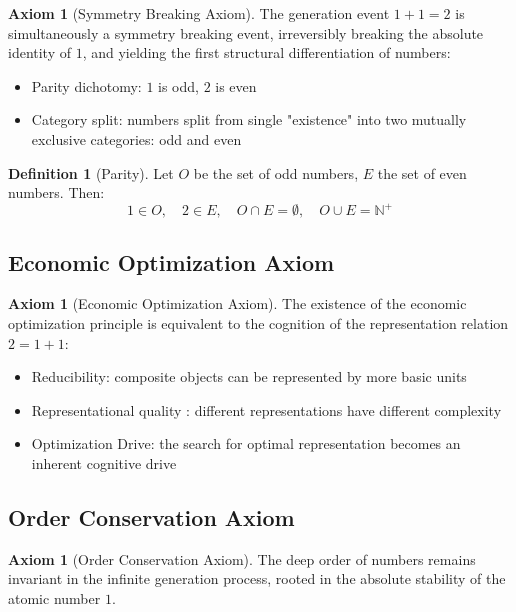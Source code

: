 \documentclass[12pt]{article}
\theoremstyle{definition}
\newtheorem{definition}[theorem]{Definition}
\newtheorem{axiom}[theorem]{Axiom}
\newcommand{\N}{\mathbb{N}}
\begin{document}
\begin{axiom}[Symmetry Breaking Axiom]
The generation event \(1+1=2\) is simultaneously a symmetry breaking event, irreversibly breaking the absolute identity of \(1\), and yielding the first structural differentiation of numbers:
\begin{itemize}
    \item Parity dichotomy: \(1\) is odd, \(2\) is even
    \item Category split: numbers split from single "existence" into two mutually exclusive categories: odd and even
\end{itemize}
\end{axiom}

\begin{definition}[Parity]
Let \(O\) be the set of odd numbers, \(E\) the set of even numbers. Then:
\[
1 \in O,\quad 2 \in E,\quad O \cap E = \emptyset,\quad O \cup E = \N^+
\]
\end{definition}

\subsection{Economic Optimization Axiom}

\begin{axiom}[Economic Optimization Axiom]
The existence of the economic optimization principle is equivalent to the cognition of the representation relation \(2 = 1 + 1\):
\begin{itemize}
    \item Reducibility: composite objects can be represented by more basic units
    \item Representational quality : different representations have different complexity
    \item Optimization Drive: the search for optimal representation becomes an inherent cognitive drive
\end{itemize}
\end{axiom}

\subsection{Order Conservation Axiom}

\begin{axiom}[Order Conservation Axiom]
The deep order of numbers remains invariant in the infinite generation process, rooted in the absolute stability of the atomic number \(1\).
\end{axiom}
\end{document}
